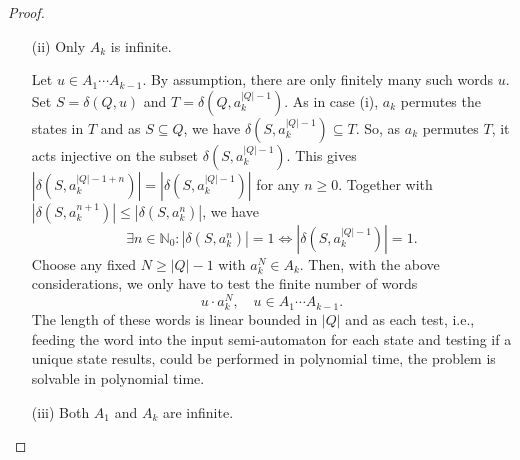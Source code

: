 \begin{proof}
\begin{enumerate}
 \item[(ii)] Only $A_k$ is infinite.
 
  Let $u \in A_1 \cdots A_{k-1}$. By assumption, there are only finitely many such
  words $u$. Set $S = \delta(Q, u)$ and $T = \delta(Q, a_k^{|Q|-1})$.
  As in case (i), $a_k$ permutes the states in $T$
  and as $S \subseteq Q$, we have  $\delta(S, a_k^{|Q|- 1}) \subseteq T$.
  So, as $a_k$ permutes $T$, it acts injective on the
  subset $\delta(S, a_k^{|Q|- 1})$.
  This gives $|\delta(S, a_k^{|Q|- 1 + n})| = |\delta(S, a_k^{|Q|- 1})|$
  for any $n \ge 0$. Together with $|\delta(S, a_k^{n + 1})| \le |\delta(S, a_k^{n})|$,
  we have
  \begin{equation}\label{eqn:case_two_P}
   \exists n \in \mathbb N_0 : |\delta(S, a_k^{n})| = 1 \Leftrightarrow |\delta(S, a_k^{|Q|- 1})| = 1.
  \end{equation}
  Choose any fixed $N \ge |Q| - 1$ with $a_k^N \in A_k$.
  Then, with the above considerations, we only have to test the finite
  number of words
  \[
   u\cdot a_k^{N}, \quad u \in A_1 \cdots A_{k-1}.
  \]
  The length of these words is linear bounded in $|Q|$ and 
  as each test, i.e., feeding the word into the input semi-automaton
  for each state and testing if a unique state results,
  could be performed in polynomial time, the problem is solvable in polynomial time.
  
 \item[(iii)] Both $A_1$ and $A_k$ are infinite.
  

\end{enumerate}
\end{proof}
